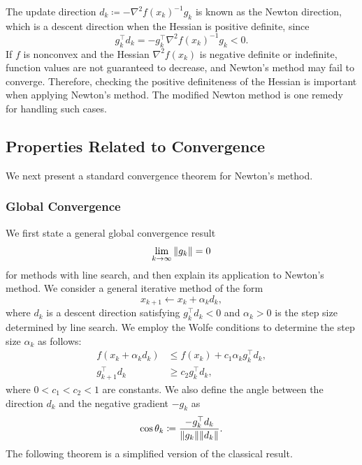 \documentclass[en]{subfiles}
\begin{document}
The update direction $d_k \coloneqq -\nabla^2 f(x_k)^{-1} g_k$ is known as the Newton direction, which is a descent direction when the Hessian is positive definite, since
\begin{equation*}
    g_k^\top d_k = -g_k^\top \nabla^2 f(x_k)^{-1} g_k < 0.
\end{equation*}
If $f$ is nonconvex and the Hessian $\nabla^2 f(x_k)$ is negative definite or indefinite, function values are not guaranteed to decrease, and Newton's method may fail to converge.
Therefore, checking the positive definiteness of the Hessian is important when applying Newton's method.
The modified Newton method \citep[Sec. 3.4]{nocedal1999numerical} is one remedy for handling such cases.

\subsection{Properties Related to Convergence}
\label{sec:newton-local-convergence}

We next present a standard convergence theorem for Newton's method.

\subsubsection{Global Convergence}

We first state a general global convergence result
\begin{equation*}
    \lim_{k \to \infty} \norm{g_k} = 0
\end{equation*}
for methods with line search, and then explain its application to Newton's method.
We consider a general iterative method of the form
\begin{equation*}
    x_{k+1} \gets x_k + \alpha_k d_k,
\end{equation*}
where $d_k$ is a descent direction satisfying $g_k^\top d_k < 0$ and $\alpha_k > 0$ is the step size determined by line search.
We employ the Wolfe conditions \citep[Sec. 3.1]{nocedal1999numerical} to determine the step size $\alpha_k$ as follows:
\begin{align}
    f(x_k + \alpha_k d_k) & \leq f(x_k) + c_1 \alpha_k g_k^\top d_k, \label{eq:wolfe-1} \\
    g_{k+1}^\top d_k      & \geq c_2 g_k^\top d_k, \label{eq:wolfe-2}
\end{align}
where $0 < c_1 < c_2 < 1$ are constants.
We also define the angle between the direction $d_k$ and the negative gradient $-g_k$ as
\begin{equation}\label{eq:angle-definition}
    \cos \theta_k \coloneqq \frac{-g_k^\top d_k}{\norm{g_k}\norm{d_k}}.
\end{equation}
The following theorem is a simplified version of the classical result.
\end{document}
